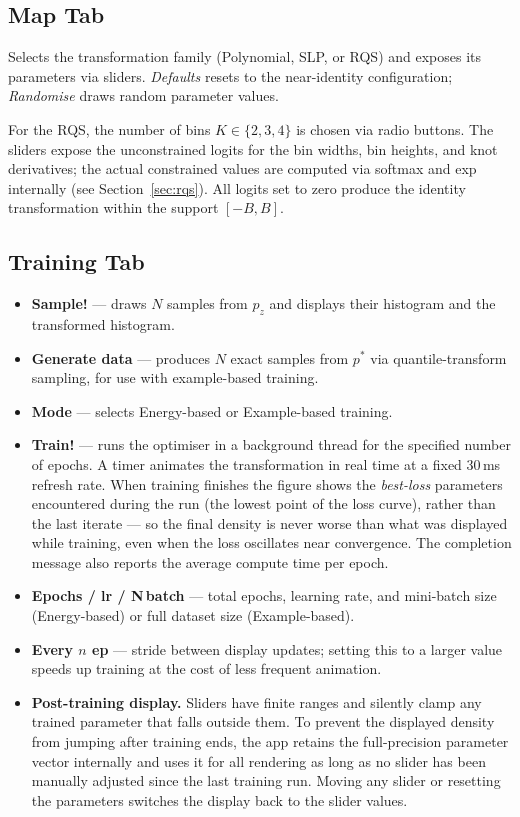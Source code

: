 \documentclass[11pt,a4paper]{article}
\newcommand{\pz}{p_z}
\begin{document}
\subsection{Map Tab}

Selects the transformation family (Polynomial, SLP, or RQS) and exposes
its parameters via sliders.  \emph{Defaults} resets to the near-identity
configuration; \emph{Randomise} draws random parameter values.

For the RQS, the number of bins $K\in\{2,3,4\}$ is chosen via radio
buttons.  The sliders expose the unconstrained logits for the bin widths,
bin heights, and knot derivatives; the actual constrained values are
computed via softmax and exp internally (see Section~\ref{sec:rqs}).
All logits set to zero produce the identity transformation within the
support $[-B,B]$.

\subsection{Training Tab}

\begin{itemize}
  \item \textbf{Sample!} — draws $N$ samples from $\pz$ and displays
        their histogram and the transformed histogram.
  \item \textbf{Generate data} — produces $N$ exact samples from $p^*$
        via quantile-transform sampling, for use with example-based
        training.
  \item \textbf{Mode} — selects Energy-based or Example-based training.
  \item \textbf{Train!} — runs the optimiser in a background thread for
        the specified number of epochs.  A timer animates the transformation
        in real time at a fixed 30\,ms refresh rate.  When training finishes
        the figure shows the \emph{best-loss} parameters encountered during
        the run (the lowest point of the loss curve), rather than the last
        iterate — so the final density is never worse than what was displayed
        while training, even when the loss oscillates near convergence.  The
        completion message also reports the average compute time per epoch.
  \item \textbf{Epochs / lr / N\,batch} — total epochs, learning rate,
        and mini-batch size (Energy-based) or full dataset size
        (Example-based).
  \item \textbf{Every $n$ ep} — stride between display updates; setting
        this to a larger value speeds up training at the cost of less
        frequent animation.
  \item \textbf{Post-training display.}  Sliders have finite ranges and
        silently clamp any trained parameter that falls outside them.  To
        prevent the displayed density from jumping after training ends, the
        app retains the full-precision parameter vector internally and uses
        it for all rendering as long as no slider has been manually adjusted
        since the last training run.  Moving any slider or resetting the
        parameters switches the display back to the slider values.
\end{itemize}
\end{document}
